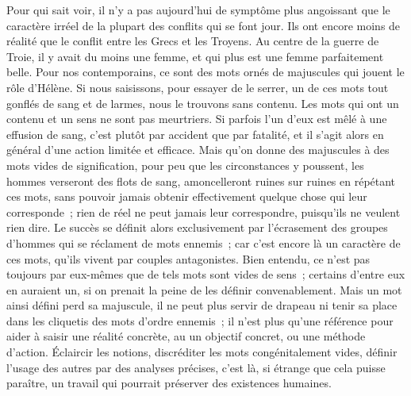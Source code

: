 \documentclass[french,twoside]{book} %
\begin{document}
Pour qui sait voir, il n'y a pas aujourd'hui de symptôme plus angoissant que le caractère irréel de la plupart des conflits qui se font jour. Ils ont encore moins de réalité que le conflit entre les Grecs et les Troyens. Au centre de la guerre de Troie, il y avait du moins une femme, et qui plus est une femme parfaitement belle. Pour nos contemporains, ce sont des mots ornés de majuscules qui jouent le rôle d'Hélène. Si nous saisissons, pour essayer de le serrer, un de ces mots tout gonflés de sang et de larmes, nous le trouvons sans contenu. Les mots qui ont un contenu et un sens ne sont pas meurtriers. Si parfois l'un d'eux est mêlé à une effusion de sang, c'est plutôt par accident que par fatalité, et il s'agit alors en général d'une action limitée et efficace. Mais qu'on donne des majuscules à des mots vides de signification, pour peu que les circonstances y poussent, les hommes verseront des flots de sang, amon­celleront ruines sur ruines en répétant ces mots, sans pouvoir jamais obtenir effectivement quelque chose qui leur corresponde ; rien de réel ne peut jamais leur correspondre, puisqu'ils ne veulent rien dire. Le succès se définit alors exclusivement par l'écrasement des groupes d'hommes qui se réclament de mots ennemis ; car c'est encore là un caractère de ces mots, qu'ils vivent par couples antagonistes. Bien entendu, ce n'est pas toujours par eux-mêmes que de tels mots sont vides de sens ; certains d'entre eux en auraient un, si on prenait la peine de les définir convenablement. Mais un mot ainsi défini perd sa majuscule, il ne peut plus servir de drapeau ni tenir sa place dans les cliquetis des mots d'ordre ennemis ; il n'est plus qu'une référence pour aider à saisir une réalité concrète, au un objectif concret, ou une méthode d'action. Éclaircir les notions, discréditer les mots congénitalement vides, définir l'usage des autres par des analyses précises, c'est là, si étrange que cela puisse paraître, un travail qui pourrait préserver des existences humaines.\par
\end{document}
